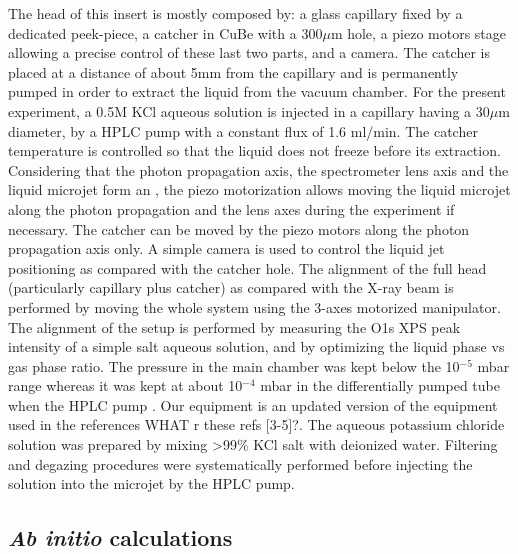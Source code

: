 The head of this insert is mostly composed by: a glass capillary fixed by a dedicated peek-piece, a catcher in CuBe with a 300$\mu$m hole, a piezo motors stage allowing a precise control of these last two parts, and a camera. The catcher is placed at a distance of about 5mm from the capillary and is permanently pumped in order to extract the liquid from the vacuum chamber. For the present experiment, a 0.5M KCl aqueous solution is injected in a capillary having a 30$\mu$m diameter, by a HPLC pump with a constant flux of 1.6 ml/min. The catcher temperature is controlled so that the liquid does not freeze before its extraction. Considering that the photon propagation axis, the spectrometer lens axis and the liquid microjet form an , the piezo motorization allows moving the liquid microjet along the photon propagation and the lens axes during the experiment if necessary. The catcher can be moved by the piezo motors along the photon propagation axis only. A simple camera is used to control the liquid jet positioning as compared with the catcher hole. The alignment of the full head (particularly capillary plus catcher) as compared with the X-ray beam is performed by moving the whole system using the 3-axes motorized manipulator. The alignment of the setup is performed by measuring the O1s XPS peak intensity of a simple salt aqueous solution, and by optimizing the liquid phase vs gas phase ratio. The pressure in the main chamber was kept below the 10$^{-5}$ mbar range whereas it was kept at about 10$^{-4}$ mbar in the differentially pumped tube when the HPLC pump . Our equipment is an updated version of the equipment used in the references {\color{red}WHAT r these refs [3-5]?}. The aqueous potassium chloride solution was prepared by mixing >99\% KCl salt with deionized water. Filtering and degazing procedures were systematically performed before injecting the solution into the microjet by the HPLC pump.


\subsection{{\bf{\it Ab initio}} calculations}

